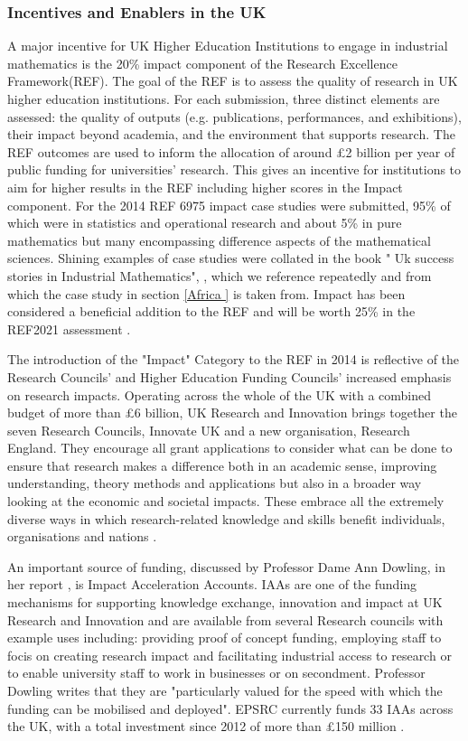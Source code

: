 \documentclass[11pt]{article} %
\begin{document}
\subsubsection{Incentives and Enablers in the UK} 
A major incentive for UK Higher Education Institutions to engage in industrial mathematics is the 20\% impact component of the Research Excellence Framework(REF). The goal of the REF is to assess the quality of research in UK higher education institutions. For each submission, three distinct elements are assessed: the quality of outputs (e.g. publications, performances, and exhibitions), their impact beyond academia, and the environment that supports research. The REF outcomes are used to inform the allocation of around £2 billion per year of public funding for universities’ research.  This gives an incentive for institutions to aim for higher results in the REF including higher scores in the Impact component. For the 2014 REF 6975 impact case studies were submitted, 95\% of which were in statistics and operational research and about 5\% in pure mathematics but many encompassing difference aspects of the mathematical sciences. Shining examples of case studies were collated in the book " Uk success stories in Industrial Mathematics", \cite{Aston2016},  which we reference repeatedly and from which the case study in section \ref{Africa } is taken from. Impact has been considered a beneficial addition to the REF and will be worth 25\% in the REF2021 assessment \cite{REF2017}.

The introduction of the "Impact" Category to the REF in 2014 is reflective of the Research Councils' and Higher Education Funding Councils' increased emphasis on research impacts. Operating across the whole of the UK with a combined budget of more than £6 billion, UK Research and Innovation brings together the seven Research Councils, Innovate UK and a new organisation, Research England. They encourage all grant applications to consider  what can be done to ensure that research makes a difference both in an academic sense, improving understanding, theory methods and applications but also in a broader way looking at the economic and societal impacts. These embrace all the extremely diverse ways in which research-related knowledge and skills benefit individuals, organisations and nations \cite{UKRI}. 

An important source of funding, discussed by Professor Dame Ann Dowling, in her report \cite{DOWLING2015}, is Impact Acceleration Accounts. IAAs are one of the funding mechanisms for supporting knowledge exchange, innovation and impact at UK Research and Innovation and are available from several Research councils with example uses including: providing proof of concept funding, employing staff to focis on creating research impact and facilitating industrial access to research or to enable university staff to work in businesses or on secondment. Professor Dowling writes that they are "particularly valued for the speed with which the funding can be mobilised and deployed".  EPSRC currently funds 33 IAAs across the UK, with a total investment since 2012 of more than £150 million \cite{IAA}.
		
\end{document}
